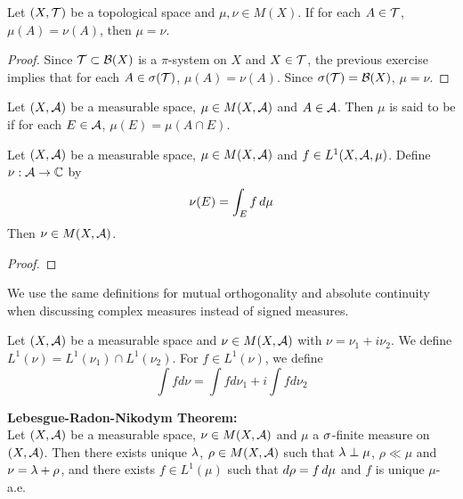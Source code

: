 \documentclass{book}
\begin{document}
	\begin{ex}  
		Let $(X, \mathcal{T})$ be a topological space and $\mu, \nu \in M(X)$. If for each $A \in \mathcal{T}$, $\mu(A) = \nu(A)$, then $\mu = \nu$.
	\end{ex}

	\begin{proof}
		Since $\mathcal{T} \subset \mathcal{B}(X)$ is a $\pi$-system on $X$ and $X \in \mathcal{T}$, the previous exercise implies that for each $A \in \sigma(\mathcal{T})$, $\mu(A) = \nu(A)$. Since $\sigma(\mathcal{T}) = \mathcal{B}(X)$, $\mu = \nu$. 
	\end{proof}

	\begin{defn}  
		Let $(X, \mathcal{A})$ be a measurable space, $\mu \in M(X, \mathcal{A})$ and $A \in \mathcal{A}$. Then $\mu$ is said to be  if for each $E \in \mathcal{A}$, $\mu(E) = \mu(A \cap E)$. \\
	\end{defn}

	\begin{ex}  
		Let $(X, \mathcal{A})$ be a measurable space, $\mu \in M(X, \mathcal{A})$ and $f \in L^1(X, \mathcal{A}, \mu)$. Define $\nu: \mathcal{A} \rightarrow \mathbb{C}$ by 
		$$ \nu(E) = \int_E f \, d \mu $$
		Then $\nu \in M(X, \mathcal{A})$.
	\end{ex}

	\begin{proof}
	\end{proof}
	
	\begin{note}
		We use the same definitions for mutual orthogonality and absolute continuity when discussing complex measures instead of signed measures.
	\end{note}
	
	\begin{defn}  
		Let $(X,\mathcal{A})$ be a measurable space and $\nu \in M(X, \mathcal{A})$ with $\nu = \nu_1 + i\nu_2$. We define $L^1(\nu) = L^1(\nu_1)\cap L^1(\nu_2)$. For $f \in L^1(\nu)$, we define $$\int f d\nu = \int fd\nu_1 + i \int f d \nu_2$$
	\end{defn}
	
	\begin{thm}\textbf{Lebesgue-Radon-Nikodym Theorem:}\\
		Let $(X,\mathcal{A})$ be a measurable space, $\nu \in M(X, \mathcal{A})$ and $\mu$ a $\sigma$-finite measure on $(X, \mathcal{A})$. Then there exists unique $\lambda$, $\rho \in M(X, \mathcal{A})$ such that $\lambda \perp \mu$, $\rho \ll \mu$ and $\nu = \lambda + \rho$, and there exists $f \in L^1(\mu)$ such that $d\rho = f \, d \mu$ and $f$ is unique $\mu$-a.e.  
	\end{thm}
	
\end{document}
